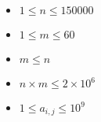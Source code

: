 \begin{itemize}
\tightlist
\item $1 \leq n \leq 150000$
\item $1 \leq m \leq 60$
\item $m \leq n$
\item $n \times m \leq 2 \times 10^6$
\item $1 \leq a_{i,j} \leq 10^9$
\end{itemize}
